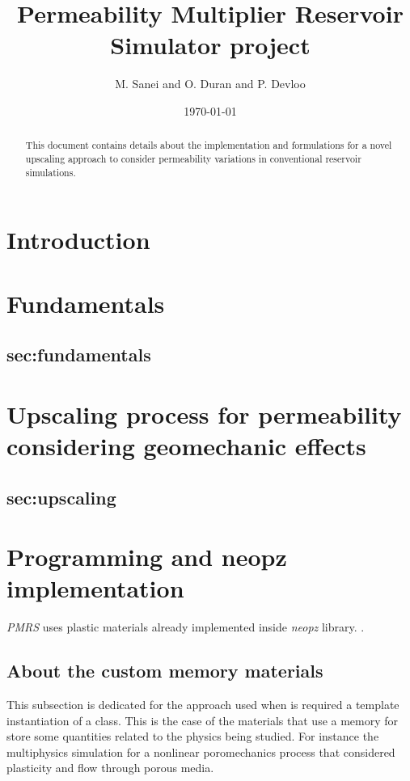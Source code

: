 \documentclass[a4paper]{article}
\title{Permeability Multiplier Reservoir Simulator \PMRS project}
\author{M. Sanei and O.  Duran and P.  Devloo}
\date{\today}
\newcommand{\PMRS}{\textit{PMRS }}
\newcommand{\neopz}{\textit{neopz }}
\begin{document}
\maketitle

\begin{abstract}
This document contains details about the implementation and formulations for a novel upscaling approach to consider permeability variations in conventional reservoir simulations.
\end{abstract}

\section{Introduction}
\label{sec:introduction}

\section{Fundamentals}
\subsection{sec:fundamentals}

\section{Upscaling process for permeability considering geomechanic effects}
\subsection{sec:upscaling}

\section{Programming and neopz implementation}
\label{sec:programmaing}

\PMRS uses plastic materials already implemented inside \neopz library.  
\cite{SouzaNeto2008}.

\subsection{About the custom memory materials}

This subsection is dedicated for the approach used when is required a  template instantiation of a class. This is the case of the materials that use a memory for store some quantities related to the physics being studied. For instance the multiphysics simulation for a nonlinear poromechanics process that considered plasticity and flow through porous media. 
\end{document}
